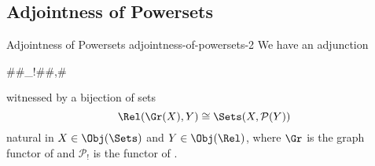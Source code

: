 \subsection{Adjointness of Powersets \rmII}\label{subsection-adjointness-of-powersets-2}
\begin{proposition}{Adjointness of Powersets \rmII}{adjointness-of-powersets-2}%
    We have an adjunction
    \begin{webcompile}
        \Adjunction#\Gr#_{!}#\Sets#\Rel,#
    \end{webcompile}%
    witnessed by a bijection of sets%
    \[
        \Rel(\Gr(X),Y)
        \cong
        \Sets(X,\mathcal{P}(Y))
    \]%
    natural in $X\in\Obj(\Sets)$ and $Y\in\Obj(\Rel)$, where $\Gr$ is the graph functor of  and $\mathcal{P}_{!}$ is the functor of .
\end{proposition}
